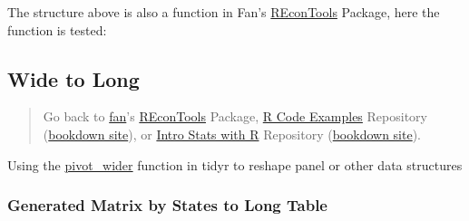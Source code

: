 \documentclass[
]{book}
\newenvironment{Shaded}{\begin{snugshade}}{\end{snugshade}}
\newcommand{\CommentTok}[1]{\textcolor[rgb]{0.56,0.35,0.01}{\textit{#1}}}
\newcommand{\KeywordTok}[1]{\textcolor[rgb]{0.13,0.29,0.53}{\textbf{#1}}}
\newcommand{\NormalTok}[1]{#1}
\newcommand{\OperatorTok}[1]{\textcolor[rgb]{0.81,0.36,0.00}{\textbf{#1}}}
\newcommand{\StringTok}[1]{\textcolor[rgb]{0.31,0.60,0.02}{#1}}
\begin{document}
The structure above is also a function in Fan's \href{https://fanwangecon.github.io/REconTools/}{REconTools} Package, here the function is tested:

\begin{Shaded}
\end{Shaded}

\hypertarget{wide-to-long}{%
\subsection{Wide to Long}\label{wide-to-long}}

\begin{quote}
Go back to \href{http://fanwangecon.github.io/}{fan}'s \href{https://fanwangecon.github.io/REconTools/}{REconTools} Package, \href{https://fanwangecon.github.io/R4Econ/}{R Code Examples} Repository (\href{https://fanwangecon.github.io/R4Econ/bookdown}{bookdown site}), or \href{https://fanwangecon.github.io/Stat4Econ/}{Intro Stats with R} Repository (\href{https://fanwangecon.github.io/Stat4Econ/bookdown}{bookdown site}).
\end{quote}

Using the \href{https://tidyr.tidyverse.org/reference/pivot_wider.html}{pivot\_wider} function in tidyr to reshape panel or other data structures

\hypertarget{generated-matrix-by-states-to-long-table}{%
\subsubsection{Generated Matrix by States to Long Table}\label{generated-matrix-by-states-to-long-table}}
\end{document}
